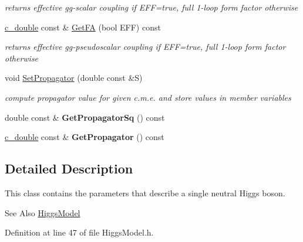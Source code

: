 \begin{DoxyCompactItemize}
\begin{DoxyCompactList}\small\item\em returns effective gg-\/scalar coupling if E\-F\-F=true, full 1-\/loop form factor otherwise \end{DoxyCompactList}\item 
\hypertarget{classHiggsBoson_a8af3de930fb155b566956ab7c0457e29}{\hyperlink{Global_8h_af390c6bd8192faf6a1e2d875a1d10ca0}{c\-\_\-double} const \& \hyperlink{classHiggsBoson_a8af3de930fb155b566956ab7c0457e29}{Get\-F\-A} (bool E\-F\-F) const }\label{classHiggsBoson_a8af3de930fb155b566956ab7c0457e29}

\begin{DoxyCompactList}\small\item\em returns effective gg-\/pseudoscalar coupling if E\-F\-F=true, full 1-\/loop form factor otherwise \end{DoxyCompactList}\item 
void \hyperlink{classHiggsBoson_aea2f63913f070158dda0693c60f3c860}{Set\-Propagator} (double const \&S)
\begin{DoxyCompactList}\small\item\em compute propagator value for given c.\-m.\-e. and store values in member variables \end{DoxyCompactList}\item 
\hypertarget{classHiggsBoson_a3b836f00cee69f41cd04dd61e86bc4ab}{double const \& {\bfseries Get\-Propagator\-Sq} () const }\label{classHiggsBoson_a3b836f00cee69f41cd04dd61e86bc4ab}

\item 
\hypertarget{classHiggsBoson_abc21bb217a9a176025516e429a6c25ee}{\hyperlink{Global_8h_af390c6bd8192faf6a1e2d875a1d10ca0}{c\-\_\-double} const \& {\bfseries Get\-Propagator} () const }\label{classHiggsBoson_abc21bb217a9a176025516e429a6c25ee}

\end{DoxyCompactItemize}


\subsection{Detailed Description}
This class contains the parameters that describe a single neutral Higgs boson. \begin{DoxySeeAlso}{See Also}
\hyperlink{classHiggsModel}{Higgs\-Model} 
\end{DoxySeeAlso}


Definition at line 47 of file Higgs\-Model.\-h.



